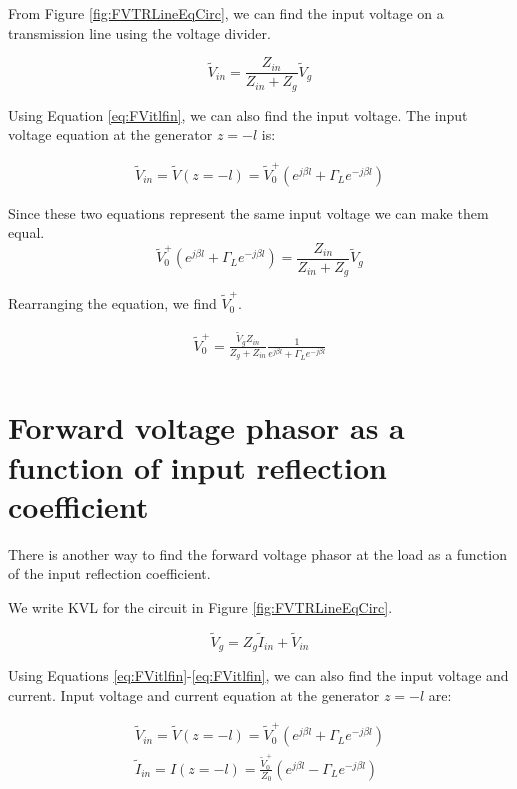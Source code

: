 \documentclass{ximera}
\begin{document}
From Figure \ref{fig:FVTRLineEqCirc}, we can find the input voltage on a transmission line using the voltage divider.

\begin{equation}
\tilde{V}_{in}= \frac{Z_{in}}{Z_{in}+Z_g} \tilde{V}_g
\end{equation} 

Using Equation \ref{eq:FVitlfin}, we can also find the input voltage.
The input voltage equation at the generator $z=-l$ is:

\begin{eqnarray}
\tilde{V}_{in}=\tilde{V}(z=-l)= \tilde{V}_0^+ (e^{j \beta l} + \Gamma_L  e^{-j \beta l } )
\end{eqnarray}

Since these two equations represent the same input voltage we can make them equal.
\begin{equation}
\tilde{V}_0^+ (e^{j \beta l} + \Gamma_L  e^{-j \beta l }) = \frac{Z_{in}}{Z_{in}+Z_g} \tilde{V}_g
\end{equation}

Rearranging the equation, we find $\tilde{V}_0^+$.

\begin{eqnarray}
\tilde{V}_0^+= \frac{\tilde{V}_g Z_{in}}{Z_g + Z_{in}} \frac{1}{e^{j \beta l} + \Gamma_L e^{-j \beta l}} \\
\end{eqnarray}




\section{Forward voltage phasor as a function of input reflection coefficient}


There is another way to find the forward voltage phasor at the load
as a function of the input reflection coefficient.


We write KVL for the circuit in Figure \ref{fig:FVTRLineEqCirc}.

\begin{equation}
\tilde{V}_g=Z_g \tilde{I}_{in} + \tilde{V}_{in} \label{eq:FVKVL}
\end{equation}


Using Equations \ref{eq:FVitlfin}-\ref{eq:FVitlfin}, we can also find the input voltage and current.
Input voltage and current equation at the generator $z=-l$ are:


\begin{eqnarray}
\tilde{V}_{in}=\tilde{V}(z=-l)= \tilde{V}_0^+ (e^{j \beta l} + \Gamma_L  e^{-j \beta l } ) \\
\tilde{I}_{in}=I(z=-l)=   \frac{\tilde{V}_0^+}{Z_0}  (e^{j \beta l} - \Gamma_L  e^{-j \beta l}  )
\end{eqnarray}
\end{document}
